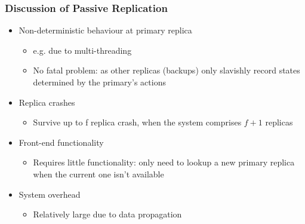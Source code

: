 \documentclass{article}[18pt]
\begin{document}
\subsubsection{Discussion of Passive Replication}
\begin{itemize}
	\item Non-deterministic behaviour at primary replica
	\begin{itemize}
		\item e.g. due to multi-threading
		\item No fatal problem: as other replicas (backups) only slavishly record states determined by the primary's actions
	\end{itemize}
	\item Replica crashes
	\begin{itemize}
		\item Survive up to f replica crash, when the system comprises $f+1$ replicas
	\end{itemize}
	\item Front-end functionality
	\begin{itemize}
		\item Requires little functionality: only need to lookup a new primary replica when the current one isn't available
	\end{itemize}
	\item System overhead
	\begin{itemize}
		\item Relatively large due to data propagation
	\end{itemize}
\end{itemize}
\end{document}
